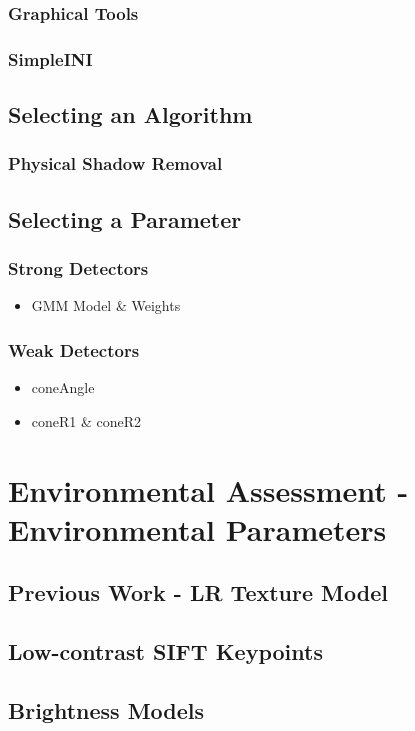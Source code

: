 \documentclass[12pt]{report}
\begin{document}
\subsubsection{Graphical Tools}
\subsubsection{SimpleINI}

\subsection{Selecting an Algorithm}
\subsubsection{Physical Shadow Removal}

\subsection{Selecting a Parameter}
\subsubsection{Strong Detectors}
	\begin{itemize}
	\item GMM Model \& Weights
	\end{itemize}
\subsubsection{Weak Detectors}
	\begin{itemize}
	\item coneAngle
	\item coneR1 \& coneR2
	\end{itemize}

\section{Environmental Assessment - Environmental Parameters}
\subsection{Previous Work - LR Texture Model}
\subsection{Low-contrast SIFT Keypoints}
\subsection{Brightness Models}
\end{document}
